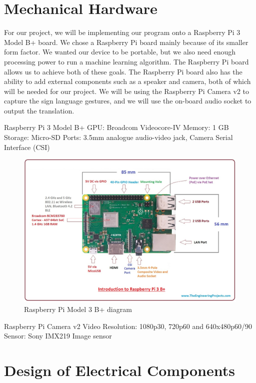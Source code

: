\documentclass[12pt, titlepage]{article}
\begin{document}
\section{Mechanical Hardware}

For our project, we will be implementing our program onto a Raspberry Pi 3 Model B+ board. We chose a Raspberry Pi board mainly because of its smaller form 
factor. We wanted our device to be portable, but we also need enough processing power to run a machine learning algorithm. The Raspberry Pi board allows us 
to achieve both of these goals. The Raspberry Pi board also has the ability to add external components such as a speaker and camera, both of which will be 
needed for our project. We will be using the Raspberry Pi Camera v2 to capture the sign language gestures, and we will use the on-board audio socket to output 
the translation.

Raspberry Pi 3 Model B+
GPU: Broadcom Videocore-IV
Memory: 1 GB
Storage: Micro-SD
Ports: 3.5mm analogue audio-video jack, Camera Serial Interface (CSI)

\begin{figure}[H] 
\centering
\includegraphics[width=\textwidth,height=0.88\textheight,keepaspectratio]{PiBoard.jpg} 
\caption{Raspberry Pi Model 3 B+ diagram} 
\label{Fig.Pi_Board} 
\end{figure}

Raspberry Pi Camera v2
Video Resolution: 1080p30, 720p60 and 640x480p60/90
Sensor: Sony IMX219 Image sensor

\section{Design of Electrical Components}
\end{document}
